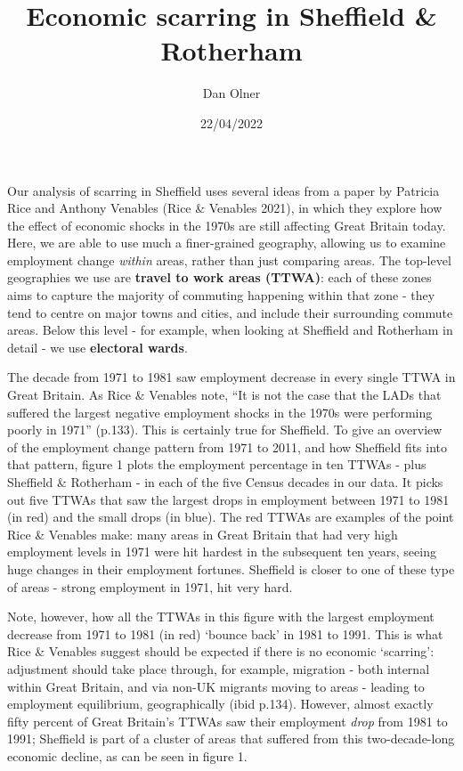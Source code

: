 \documentclass[
]{article}
\title{Economic scarring in Sheffield \& Rotherham}
\author{Dan Olner}
\date{22/04/2022}
\begin{document}
\maketitle

Our analysis of scarring in Sheffield uses several ideas from a paper by
Patricia Rice and Anthony Venables (Rice \& Venables 2021), in which
they explore how the effect of economic shocks in the 1970s are still
affecting Great Britain today. Here, we are able to use much a
finer-grained geography, allowing us to examine employment change
\emph{within} areas, rather than just comparing areas. The top-level
geographies we use are \textbf{travel to work areas (TTWA)}: each of
these zones aims to capture the majority of commuting happening within
that zone - they tend to centre on major towns and cities, and include
their surrounding commute areas. Below this level - for example, when
looking at Sheffield and Rotherham in detail - we use \textbf{electoral
wards}.

The decade from 1971 to 1981 saw employment decrease in every single
TTWA in Great Britain. As Rice \& Venables note, ``It is not the case
that the LADs that suffered the largest negative employment shocks in
the 1970s were performing poorly in 1971'' (p.133). This is certainly
true for Sheffield. To give an overview of the employment change pattern
from 1971 to 2011, and how Sheffield fits into that pattern, figure 1
plots the employment percentage in ten TTWAs - plus Sheffield \&
Rotherham - in each of the five Census decades in our data. It picks out
five TTWAs that saw the largest drops in employment between 1971 to 1981
(in red) and the small drops (in blue). The red TTWAs are examples of
the point Rice \& Venables make: many areas in Great Britain that had
very high employment levels in 1971 were hit hardest in the subsequent
ten years, seeing huge changes in their employment fortunes. Sheffield
is closer to one of these type of areas - strong employment in 1971, hit
very hard.

Note, however, how all the TTWAs in this figure with the largest
employment decrease from 1971 to 1981 (in red) `bounce back' in 1981 to
1991. This is what Rice \& Venables suggest should be expected if there
is no economic `scarring': adjustment should take place through, for
example, migration - both internal within Great Britain, and via non-UK
migrants moving to areas - leading to employment equilibrium,
geographically (ibid p.134). However, almost exactly fifty percent of
Great Britain's TTWAs saw their employment \emph{drop} from 1981 to
1991; Sheffield is part of a cluster of areas that suffered from this
two-decade-long economic decline, as can be seen in figure 1.
\end{document}
